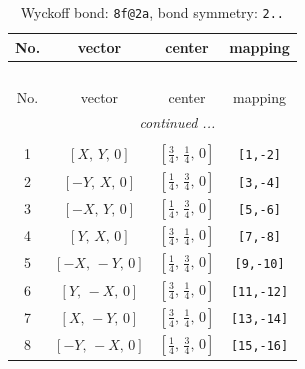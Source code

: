 \documentclass[fleqn,8pt]{jsarticle}
\begin{document}
\begin{longtable}{cccc}
\caption{Wyckoff bond: {\tt 8f@2a}, bond symmetry: {\tt 2..}}
 \\
 \hline \hline
No. & vector & center & mapping \\ \hline \endfirsthead

\multicolumn{3}{l}{\tablename\ \thetable{}} \\
 \hline \hline
No. & vector & center & mapping \\ \hline \endhead

 \hline \hline
\multicolumn{3}{r}{\footnotesize\it continued ...} \\ \endfoot

 \hline \hline
\multicolumn{3}{r}{} \\ \endlastfoot

1 & $\left[ X,\, Y,\, 0 \right]$ & $\left[ \frac{3}{4},\, \frac{1}{4},\, 0 \right]$ & {\tt [1,-2]} \\ \hline
2 & $\left[ - Y,\, X,\, 0 \right]$ & $\left[ \frac{1}{4},\, \frac{3}{4},\, 0 \right]$ & {\tt [3,-4]} \\ \hline
3 & $\left[ - X,\, Y,\, 0 \right]$ & $\left[ \frac{1}{4},\, \frac{3}{4},\, 0 \right]$ & {\tt [5,-6]} \\ \hline
4 & $\left[ Y,\, X,\, 0 \right]$ & $\left[ \frac{3}{4},\, \frac{1}{4},\, 0 \right]$ & {\tt [7,-8]} \\ \hline
5 & $\left[ - X,\, - Y,\, 0 \right]$ & $\left[ \frac{1}{4},\, \frac{3}{4},\, 0 \right]$ & {\tt [9,-10]} \\ \hline
6 & $\left[ Y,\, - X,\, 0 \right]$ & $\left[ \frac{3}{4},\, \frac{1}{4},\, 0 \right]$ & {\tt [11,-12]} \\ \hline
7 & $\left[ X,\, - Y,\, 0 \right]$ & $\left[ \frac{3}{4},\, \frac{1}{4},\, 0 \right]$ & {\tt [13,-14]} \\ \hline
8 & $\left[ - Y,\, - X,\, 0 \right]$ & $\left[ \frac{1}{4},\, \frac{3}{4},\, 0 \right]$ & {\tt [15,-16]} \\
\end{longtable}
\renewcommand{\arraystretch}{1.2}
\end{document}
